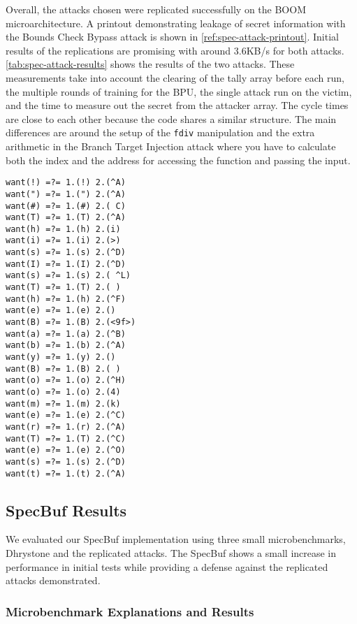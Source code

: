 Overall, the attacks chosen were replicated successfully on the BOOM microarchitecture. A printout
demonstrating leakage of secret information with the Bounds Check Bypass attack
is shown in \ref{ref:spec-attack-printout}. Initial results of the replications
are promising with around 3.6KB/s for both attacks. \ref{tab:spec-attack-results}
shows the results of the two attacks. These measurements take into account the clearing
of the tally array before each run, the multiple rounds of training for the BPU,
the single attack run on the victim, and the time to measure out the secret from the attacker array.
The cycle times are close to each other because the code shares a similar structure. The main
differences are around the setup of the {\tt fdiv} manipulation
and the extra arithmetic in the Branch Target Injection attack where you have to calculate
both the index and the address for accessing the function and passing the input. 

\begin{lstlisting}[style=column-code, caption=Printout of Bounds Check Bypass Attack]
want(!) =?= 1.(!) 2.(^A)
want(") =?= 1.(") 2.(^A)
want(#) =?= 1.(#) 2.( C)
want(T) =?= 1.(T) 2.(^A)
want(h) =?= 1.(h) 2.(i)
want(i) =?= 1.(i) 2.(>)
want(s) =?= 1.(s) 2.(^D)
want(I) =?= 1.(I) 2.(^D)
want(s) =?= 1.(s) 2.( ^L)
want(T) =?= 1.(T) 2.( )
want(h) =?= 1.(h) 2.(^F)
want(e) =?= 1.(e) 2.()
want(B) =?= 1.(B) 2.(<9f>)
want(a) =?= 1.(a) 2.(^B)
want(b) =?= 1.(b) 2.(^A)
want(y) =?= 1.(y) 2.()
want(B) =?= 1.(B) 2.( )
want(o) =?= 1.(o) 2.(^H)
want(o) =?= 1.(o) 2.(4)
want(m) =?= 1.(m) 2.(k)
want(e) =?= 1.(e) 2.(^C)
want(r) =?= 1.(r) 2.(^A)
want(T) =?= 1.(T) 2.(^C)
want(e) =?= 1.(e) 2.(^O)
want(s) =?= 1.(s) 2.(^D)
want(t) =?= 1.(t) 2.(^A)
\end{lstlisting}\label{code:spec-attack-printout}

\subsection{SpecBuf Results}

We evaluated our SpecBuf implementation using three small microbenchmarks, Dhrystone and the 
replicated attacks. The SpecBuf shows a small increase in performance in initial tests while providing
a defense against the replicated attacks demonstrated.

\subsubsection{Microbenchmark Explanations and Results}


